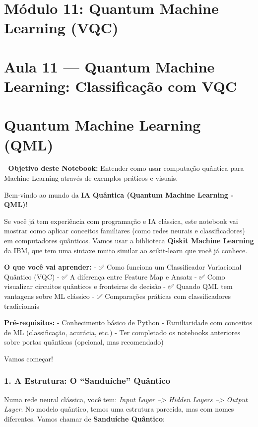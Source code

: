 \documentclass[
  brazilian,
]{report}
\begin{document}
\newpage

\chapter{Módulo 11: Quantum Machine Learning
(VQC)}\label{muxf3dulo-11-quantum-machine-learning-vqc}

\chapter{Aula 11 --- Quantum Machine Learning: Classificação com
VQC}\label{aula-11-quantum-machine-learning-classificauxe7uxe3o-com-vqc}

\chapter{Quantum Machine Learning
(QML)}\label{quantum-machine-learning-qml}

🎯 \textbf{Objetivo deste Notebook:} Entender como usar computação
quântica para Machine Learning através de exemplos práticos e visuais.

Bem-vindo ao mundo da \textbf{IA Quântica (Quantum Machine Learning -
QML)}!

Se você já tem experiência com programação e IA clássica, este notebook
vai mostrar como aplicar conceitos familiares (como redes neurais e
classificadores) em computadores quânticos. Vamos usar a biblioteca
\textbf{Qiskit Machine Learning} da IBM, que tem uma sintaxe muito
similar ao scikit-learn que você já conhece.

\textbf{O que você vai aprender:} - ✅ Como funciona um Classificador
Variacional Quântico (VQC) - ✅ A diferença entre Feature Map e Ansatz -
✅ Como visualizar circuitos quânticos e fronteiras de decisão - ✅
Quando QML tem vantagens sobre ML clássico - ✅ Comparações práticas com
classificadores tradicionais

\textbf{Pré-requisitos:} - Conhecimento básico de Python - Familiaridade
com conceitos de ML (classificação, acurácia, etc.) - Ter completado os
notebooks anteriores sobre portas quânticas (opcional, mas recomendado)

Vamos começar! 🚀

\subsection{1. A Estrutura: O ``Sanduíche''
Quântico}\label{a-estrutura-o-sanduuxedche-quuxe2ntico}

Numa rede neural clássica, você tem: \emph{Input Layer --\textgreater{}
Hidden Layers --\textgreater{} Output Layer}. No modelo quântico, temos
uma estrutura parecida, mas com nomes diferentes. Vamos chamar de
\textbf{Sanduíche Quântico}:
\end{document}
